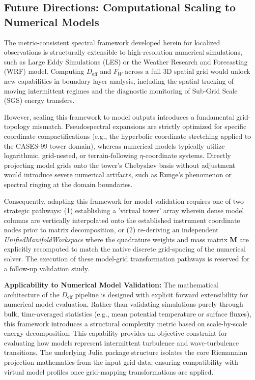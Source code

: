 \subsection{Future Directions: Computational Scaling to Numerical Models}
\label{sec:future:models}

The metric-consistent spectral framework developed herein for localized observations is structurally extensible to high-resolution numerical simulations, such as Large Eddy Simulations (LES) or the Weather Research and Forecasting (WRF) model. Computing $D_{\mathrm{eff}}$ and $F_W$ across a full 3D spatial grid would unlock new capabilities in boundary layer analysis, including the spatial tracking of moving intermittent regimes and the diagnostic monitoring of Sub-Grid Scale (SGS) energy transfers.

However, scaling this framework to model outputs introduces a fundamental grid-topology mismatch. Pseudospectral expansions are strictly optimized for specific coordinate compactifications (e.g., the hyperbolic coordinate stretching applied to the CASES-99 tower domain), whereas numerical models typically utilize logarithmic, grid-nested, or terrain-following $\eta$-coordinate systems. Directly projecting model grids onto the tower's Chebyshev basis without adjustment would introduce severe numerical artifacts, such as Runge's phenomenon or spectral ringing at the domain boundaries.

Consequently, adapting this framework for model validation requires one of two strategic pathways: (1) establishing a 'virtual tower' array wherein dense model columns are vertically interpolated onto the established instrument coordinate nodes prior to matrix decomposition, or (2) re-deriving an independent \emph{UnifiedManifoldWorkspace} where the quadrature weights and mass matrix $\mathbf{M}$ are explicitly recomputed to match the native discrete grid-spacing of the numerical solver. The execution of these model-grid transformation pathways is reserved for a follow-up validation study.

\textbf{Applicability to Numerical Model Validation:}
The mathematical architecture of the $D_{\mathrm{eff}}$ pipeline is designed with explicit forward extensibility for numerical model evaluation. Rather than validating simulations purely through bulk, time-averaged statistics (e.g., mean potential temperature or surface fluxes), this framework introduces a structural complexity metric based on scale-by-scale energy decomposition. This capability provides an objective constraint for evaluating how models represent intermittent turbulence and wave-turbulence transitions. The underlying Julia package structure isolates the core Riemannian projection mathematics from the input grid data, ensuring compatibility with virtual model profiles once grid-mapping transformations are applied.

